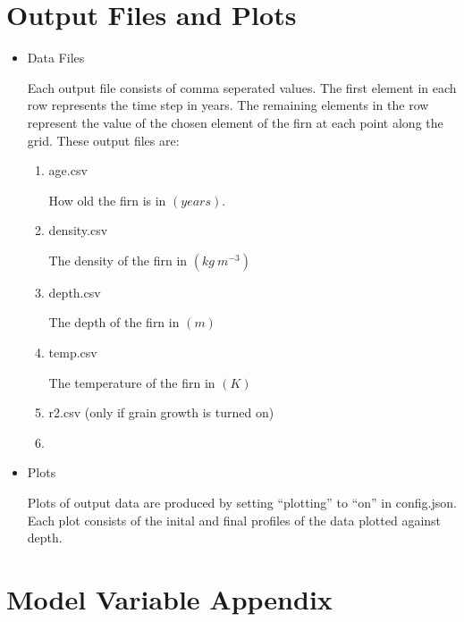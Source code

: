 \documentclass{article}
\begin{document}
\section{Output Files and Plots}
\begin{itemize}
  \item Data Files

  Each output file consists of comma seperated values. The first element in each row represents the time step in years.
  The remaining elements in the row represent the value of the chosen element of the firn at each point along the grid.
  These output files are:
  \begin{enumerate}
    \item age.csv

    How old the firn is in  \begin{math}(years)\end{math}.
    \item density.csv

    The density of the firn in \begin{math}(kg \: m^{-3})\end{math}
    \item depth.csv

    The depth of the firn in  \begin{math}(m)\end{math}

    \item temp.csv

    The temperature of the firn in  \begin{math}(K)\end{math}

    \item r2.csv (only if grain growth is turned on)
    
    \item 
    
  \end{enumerate}
  \item Plots

  Plots of output data are produced by setting ``plotting'' to ``on'' in config.json. Each plot consists of the inital and final
  profiles of the data plotted against depth.
\end{itemize}


\newpage
\appendix
\section{Model Variable Appendix}
\end{document}
